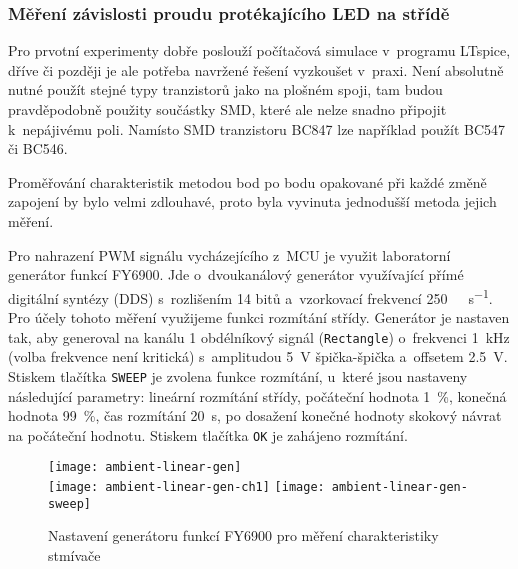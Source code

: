 \subsubsection{Měření závislosti proudu protékajícího LED na střídě}
Pro prvotní experimenty dobře poslouží počítačová simulace v~programu
LTspice, dříve či později je ale potřeba navržené řešení vyzkoušet v~praxi.
Není absolutně nutné použít stejné typy tranzistorů jako na plošném spoji, tam
budou pravděpodobně použity součástky SMD, které ale nelze snadno připojit
k~nepájivému poli. Namísto SMD tranzistoru BC847 lze například použít BC547 či
BC546.

Proměřování charakteristik metodou bod po bodu opakované při každé změně
zapojení by bylo velmi zdlouhavé, proto byla vyvinuta jednodušší metoda jejich
měření.

Pro nahrazení PWM signálu vycházejícího z~\acs{MCU} je využit laboratorní
generátor funkcí FY6900. Jde o~dvoukanálový generátor využívající přímé
digitální syntézy (DDS) s~rozlišením 14 bitů a~vzorkovací frekvencí
\SI{250}{\mega\sample\per\second}. Pro účely tohoto měření využijeme funkci
rozmítání střídy. Generátor je nastaven tak, aby generoval na kanálu 1
obdélníkový signál (\texttt{Rectangle}) o~frekvenci \SI{1}{\kilo\hertz} (volba
frekvence není kritická) s~amplitudou \SI{5}{\volt} špička-špička a~offsetem
\SI{2,5}{\volt}. Stiskem tlačítka \texttt{SWEEP} je zvolena funkce rozmítání,
u~které jsou nastaveny následující parametry: lineární rozmítání střídy,
počáteční hodnota \SI{1}{\percent}, konečná hodnota \SI{99}{\percent}, čas
rozmítání \SI{20}{\second}, po dosažení konečné hodnoty skokový návrat na
počáteční hodnotu.
Stiskem tlačítka \texttt{OK} je zahájeno rozmítání.

\begin{figure}[htb]
    \centering
    \texttt{[image: ambient-linear-gen]}
    \\ \vspace{5mm}
    \texttt{[image: ambient-linear-gen-ch1]}
    \hfill
    \texttt{[image: ambient-linear-gen-sweep]}
    \caption{%
        Nastavení generátoru funkcí FY6900 pro měření charakteristiky stmívače
    }
    \label{fig:ambient linear mereni generator}
\end{figure}

